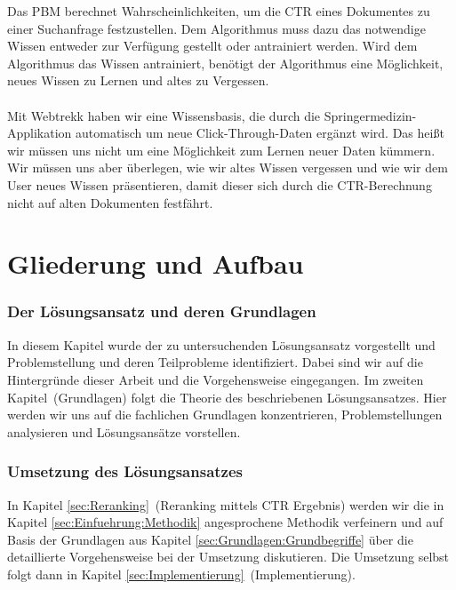 Das PBM berechnet Wahrscheinlichkeiten, um die CTR eines Dokumentes zu einer Suchanfrage festzustellen. Dem Algorithmus muss dazu das notwendige Wissen entweder zur Verfügung gestellt oder antrainiert werden. Wird dem Algorithmus das Wissen antrainiert, benötigt der Algorithmus eine Möglichkeit, neues Wissen zu Lernen und altes zu Vergessen. 
\\
\\
Mit Webtrekk haben wir eine Wissensbasis, die durch die Springermedizin-Applikation automatisch um neue Click-Through-Daten ergänzt wird. Das heißt wir müssen uns nicht um eine Möglichkeit zum Lernen neuer Daten kümmern. Wir müssen uns aber überlegen, wie wir altes Wissen vergessen und wie wir dem User neues Wissen präsentieren, damit dieser sich durch die CTR-Berechnung nicht auf alten Dokumenten festfährt.


\section{Gliederung und Aufbau}
\label{sec:Einfuehrung:GliederungAufbau}

\subsubsection{Der Lösungsansatz und deren Grundlagen}
\label{sec:Einfuehrung:GliederungAufbau:Loesungsansatz}

In diesem Kapitel wurde der zu untersuchenden Lösungsansatz vorgestellt und Problemstellung und deren Teilprobleme identifiziert. Dabei sind wir auf die Hintergründe dieser Arbeit und die Vorgehensweise eingegangen. Im zweiten Kapitel~(Grundlagen) folgt die Theorie des beschriebenen Lösungsansatzes. Hier werden wir uns auf die fachlichen Grundlagen konzentrieren, Problemstellungen analysieren und Lösungsansätze vorstellen.

\subsubsection{Umsetzung des Lösungsansatzes}
\label{sec:Einfuehrung:GliederungAufbau:Umsetzung}

In Kapitel \ref{sec:Reranking}~(Reranking mittels CTR Ergebnis) werden wir die in Kapitel \ref{sec:Einfuehrung:Methodik} angesprochene Methodik verfeinern und auf Basis der Grundlagen aus Kapitel \ref{sec:Grundlagen:Grundbegriffe} über die detaillierte Vorgehensweise bei der Umsetzung diskutieren. Die Umsetzung selbst folgt dann in Kapitel \ref{sec:Implementierung}~(Implementierung).

